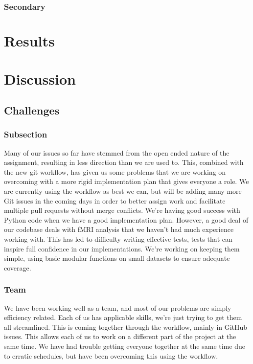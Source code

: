 \documentclass[11pt]{article}
\begin{document}
\subsubsection{Secondary}

\section{Results}

\section{Discussion}

\subsection{Challenges}

\subsubsection{Subsection}

Many of our issues so far have stemmed from the open ended nature of the
assignment, resulting in less direction than we are used to. This, combined
with the new git workflow, has given us some problems that we are working on
overcoming with a more rigid implementation plan that gives everyone a role.
We are currently using the workflow as best we can, but will be adding many
more Git issues in the coming days in order to better assign work and
facilitate multiple pull requests without merge conflicts. We're having good
success with Python code when we have a good implementation plan. However, a
good deal of our codebase deals with fMRI analysis that we haven't had much
experience working with. This has led to difficulty writing effective tests,
tests that can inspire full confidence in our implementations. We're working on
keeping them simple, using basic modular functions on small datasets to ensure
adequate coverage.

\subsubsection{Team}

We have been working well as a team, and most of our problems are simply
efficiency related. Each of us has applicable skills, we're just trying to get
them all streamlined. This is coming together through the workflow, mainly in
GitHub issues. This allows each of us to work on a different part of the
project at the same time. We have had trouble getting everyone together at the
same time due to erratic schedules, but have been overcoming this using the
workflow.
\end{document}
